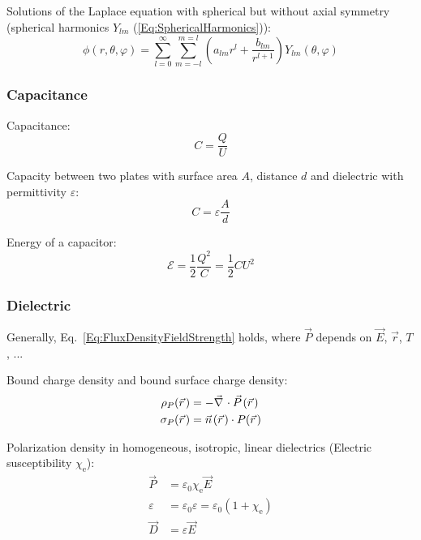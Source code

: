 			\noindent
			Solutions of the Laplace equation with spherical but without axial symmetry (spherical harmonics $Y_{lm}$ (\ref{Eq:SphericalHarmonics})):
			\begin{equation}
				\phi(r,\theta,\varphi) = \sum_{l=0}^{\infty}\sum_{m=-l}^{m=l} \left(a_{lm} r^l + \frac{b_{lm}}{r^{l+1}}\right) Y_{lm}(\theta, \varphi)
			\end{equation}

		\subsubsection{Capacitance}
			\noindent
			Capacitance:
			\begin{equation}
				C=\frac{Q}{U}
			\end{equation}

			\noindent
			Capacity between two plates with surface area $A$, distance $d$ and dielectric with permittivity  $\varepsilon$:
			\begin{equation}
				C=\varepsilon \frac{A}{d}
			\end{equation}

			\noindent
			Energy of a capacitor:
			\begin{equation}
				\mathcal{E} = \frac{1}{2}\frac{Q^2}{C} = \frac{1}{2}CU^2
			\end{equation}

		\subsubsection{Dielectric}
			\noindent
			Generally, Eq.~\ref{Eq:FluxDensityFieldStrength} holds, where $\vec{P}$ depends on $\vec{E}$, $\vec{r}$, $T$, ... \vspace{10pt}

			\noindent
			Bound charge density and bound surface charge density:
			\begin{equation}
				\begin{aligned}
					\rho_P(\vec{r}) &= -\Nabla \cdot\vec{P}(\vec{r}) \\
					\sigma_P(\vec{r}) &= \vec{n}(\vec{r})\cdot P(\vec{r})
				\end{aligned}
			\end{equation}

			\noindent
			Polarization density in homogeneous, isotropic, linear dielectrics (Electric susceptibility $\chi_\text{e}$):
			\begin{equation}
				\begin{aligned}
					\vec{P} &= \varepsilon_0 \chi_\text{e} \vec{E} \\
					\varepsilon &= \varepsilon_0 \varepsilon = \varepsilon_0(1+\chi_\text{e}) \\
					\vec{D} &= \varepsilon \vec{E} \\
				\end{aligned}
			\end{equation}


